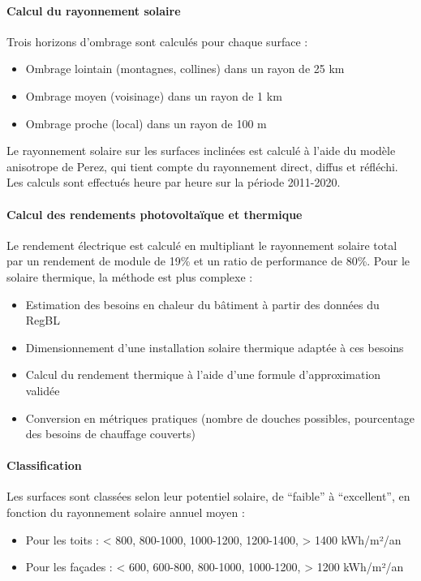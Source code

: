\paragraph{Calcul du rayonnement solaire}
Trois horizons d'ombrage sont calculés pour chaque surface :
\begin{itemize}
    \item Ombrage lointain (montagnes, collines) dans un rayon de 25 km
    \item Ombrage moyen (voisinage) dans un rayon de 1 km
    \item Ombrage proche (local) dans un rayon de 100 m
\end{itemize}
\par{Le rayonnement solaire sur les surfaces inclinées est calculé à l'aide du modèle anisotrope de Perez, qui tient compte du rayonnement direct, diffus et réfléchi. Les calculs sont effectués heure par heure sur la période 2011-2020.}

\paragraph{Calcul des rendements photovoltaïque et thermique}
\par{Le rendement électrique est calculé en multipliant le rayonnement solaire total par un rendement de module de 19\% et un ratio de performance de 80\%. Pour le solaire thermique, la méthode est plus complexe :}
\begin{itemize}
    \item Estimation des besoins en chaleur du bâtiment à partir des données du RegBL
    \item Dimensionnement d'une installation solaire thermique adaptée à ces besoins
    \item Calcul du rendement thermique à l'aide d'une formule d'approximation validée
    \item Conversion en métriques pratiques (nombre de douches possibles, pourcentage des besoins de chauffage couverts)
\end{itemize}

\paragraph{Classification}
\par{Les surfaces sont classées selon leur potentiel solaire, de ``faible'' à ``excellent'', en fonction du rayonnement solaire annuel moyen :}
\begin{itemize}
    \item Pour les toits : < 800, 800-1000, 1000-1200, 1200-1400, > 1400 kWh/m²/an
    \item Pour les façades : < 600, 600-800, 800-1000, 1000-1200, > 1200 kWh/m²/an
\end{itemize}

